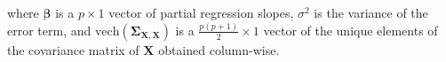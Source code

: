 \noindent where
$\boldsymbol{\beta}$ is a $p \times 1$ vector of partial regression slopes,
$\sigma^2$ is the variance of the error term,
and
$\mathrm{vech} \left( \boldsymbol{\Sigma}_{\mathbf{X}, \mathbf{X}} \right)$
is a $\frac{p \left( p + 1 \right)}{2} \times 1$ vector of the unique elements
of the covariance matrix of
$\mathbf{X}$
obtained column-wise.